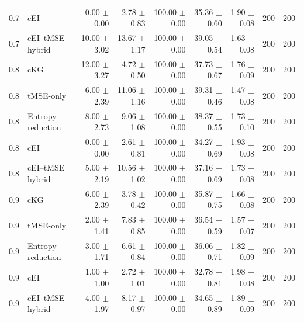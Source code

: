 \begin{tabular}{@{}clrrrrrrr@{}}
0.7 & cEI & 0.00 $\pm$ 0.00 & 2.78 $\pm$ 0.83 & 100.00 $\pm$ 0.00 & 35.36 $\pm$ 0.60 & 1.90 $\pm$ 0.08 & 200 & 200 \\
0.7 & cEI--tMSE hybrid & 10.00 $\pm$ 3.02 & 13.67 $\pm$ 1.17 & 100.00 $\pm$ 0.00 & 39.05 $\pm$ 0.54 & 1.63 $\pm$ 0.08 & 200 & 200 \\
0.8 & cKG & 12.00 $\pm$ 3.27 & 4.72 $\pm$ 0.50 & 100.00 $\pm$ 0.00 & 37.73 $\pm$ 0.67 & 1.76 $\pm$ 0.09 & 200 & 200 \\
0.8 & tMSE-only & 6.00 $\pm$ 2.39 & 11.06 $\pm$ 1.16 & 100.00 $\pm$ 0.00 & 39.31 $\pm$ 0.46 & 1.47 $\pm$ 0.08 & 200 & 200 \\
0.8 & Entropy reduction & 8.00 $\pm$ 2.73 & 9.06 $\pm$ 1.08 & 100.00 $\pm$ 0.00 & 38.37 $\pm$ 0.55 & 1.73 $\pm$ 0.10 & 200 & 200 \\
0.8 & cEI & 0.00 $\pm$ 0.00 & 2.61 $\pm$ 0.81 & 100.00 $\pm$ 0.00 & 34.27 $\pm$ 0.69 & 1.93 $\pm$ 0.08 & 200 & 200 \\
0.8 & cEI--tMSE hybrid & 5.00 $\pm$ 2.19 & 10.56 $\pm$ 1.02 & 100.00 $\pm$ 0.00 & 37.16 $\pm$ 0.69 & 1.73 $\pm$ 0.08 & 200 & 200 \\
0.9 & cKG & 6.00 $\pm$ 2.39 & 3.78 $\pm$ 0.42 & 100.00 $\pm$ 0.00 & 35.87 $\pm$ 0.75 & 1.66 $\pm$ 0.08 & 200 & 200 \\
0.9 & tMSE-only & 2.00 $\pm$ 1.41 & 7.83 $\pm$ 0.85 & 100.00 $\pm$ 0.00 & 36.54 $\pm$ 0.59 & 1.57 $\pm$ 0.07 & 200 & 200 \\
0.9 & Entropy reduction & 3.00 $\pm$ 1.71 & 6.61 $\pm$ 0.84 & 100.00 $\pm$ 0.00 & 36.06 $\pm$ 0.71 & 1.82 $\pm$ 0.09 & 200 & 200 \\
0.9 & cEI & 1.00 $\pm$ 1.00 & 2.72 $\pm$ 1.01 & 100.00 $\pm$ 0.00 & 32.78 $\pm$ 0.81 & 1.98 $\pm$ 0.08 & 200 & 200 \\
0.9 & cEI--tMSE hybrid & 4.00 $\pm$ 1.97 & 8.17 $\pm$ 0.97 & 100.00 $\pm$ 0.00 & 34.65 $\pm$ 0.89 & 1.89 $\pm$ 0.09 & 200 & 200 \\
\bottomrule
\end{tabular}
\smallskip


